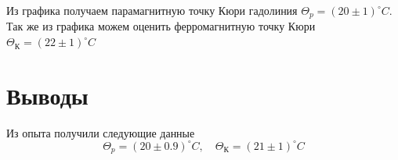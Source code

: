 \documentclass{article}
\begin{document}
Из графика получаем парамагнитную точку Кюри гадолиния
$\Theta_p = (20 \pm 1) ^\circ C$. Так же из графика можем оценить ферромагнитную 
точку Кюри $\Theta_{К} = (22 \pm 1) ^\circ C$

\newpage
\section{Выводы}
Из опыта получили следующие данные
\begin{equation}
    \Theta_p = (20 \pm 0.9) ^\circ C \mathrm{,}\quad \Theta_{К} = (21 \pm 1) ^\circ C
\end{equation}
\end{document}
